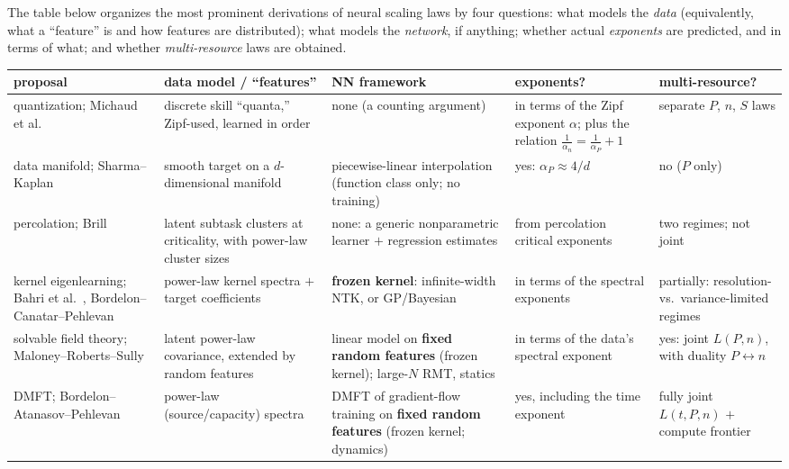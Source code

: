 \documentclass[11pt]{article}
\begin{document}
The table below organizes the most prominent derivations of neural scaling laws by four questions: what models the \emph{data} (equivalently, what a ``feature'' is and how features are distributed); what models the \emph{network}, if anything; whether actual \emph{exponents} are predicted, and in terms of what; and whether \emph{multi-resource} laws are obtained.
%
\begin{center}
\footnotesize
\renewcommand{\arraystretch}{1.45}
\setlength{\tabcolsep}{3.5pt}
\begin{tabular}{>{\raggedright\arraybackslash}p{2.5cm}|>{\raggedright\arraybackslash}p{3.1cm}|>{\raggedright\arraybackslash}p{2.7cm}|>{\raggedright\arraybackslash}p{2.6cm}|>{\raggedright\arraybackslash}p{2.2cm}}
    \textbf{proposal} & \textbf{data model / ``features''} &
    \textbf{NN framework} & \textbf{exponents?} &
    \textbf{multi-resource?} \\\hline
    quantization; Michaud et al.\ \cite{michaud2023quantization} &
    discrete skill ``quanta,'' Zipf-used, learned in order & none (a
    counting argument) & in terms of the Zipf exponent $\alpha$; plus
    the relation $\tfrac{1}{\alpha_n} = \tfrac{1}{\alpha_P} + 1$ &
    separate $P$, $n$, $S$ laws \\
    data manifold; Sharma--Kaplan \cite{sharma2020neural} & smooth
    target on a $d$-dimensional manifold & piecewise-linear
    interpolation (function class only; no training) & yes: $\alpha_P \approx 4/d$ & no ($P$ only) \\
    percolation; Brill \cite{brill2024scaling} & latent subtask
    clusters at criticality, with power-law cluster sizes & none: a generic
    nonparametric learner $+$ regression estimates & from percolation critical
    exponents & two regimes; not joint \\
    kernel eigenlearning; Bahri et al.\ \cite{bahri2021explaining},
    Bordelon--Canatar--Pehlevan \cite{bordelon2020spectrum,canatar2021spectral,simon2023eigenlearning}
    & power-law kernel spectra $+$ target coefficients & \textbf{frozen kernel}:
    infinite-width NTK, or GP/Bayesian & in terms of the spectral exponents &
    partially: resolution- vs.\ variance-limited regimes \\
    solvable field theory; Maloney--Roberts--Sully
    \cite{maloney2022solvable} & latent power-law covariance, extended
    by random features & linear model on \textbf{fixed random features}
    (frozen kernel); large-$N$ RMT, statics & in terms of the data's spectral exponent & yes: joint
    $L(P,n)$, with duality $P \leftrightarrow n$ \\
    DMFT; Bordelon--Atanasov--Pehlevan \cite{bordelon2024dynamical} &
    power-law (source/capacity) spectra & DMFT of gradient-flow
    training on \textbf{fixed random features} (frozen kernel; dynamics) & yes, including the time exponent & fully
    joint $L(t,P,n)$ $+$ compute frontier \\
\end{tabular}
\end{center}
\end{document}
